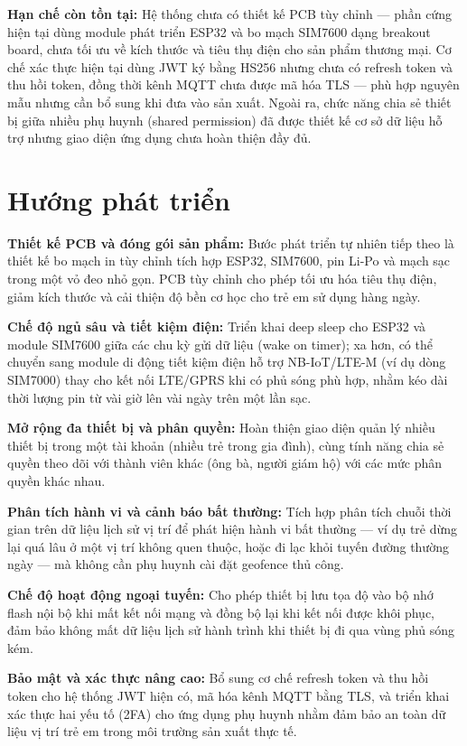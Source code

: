 \documentclass[../DoAn.tex]{subfiles}
\begin{document}
\textbf{Hạn chế còn tồn tại:} Hệ thống chưa có thiết kế PCB tùy chỉnh — phần cứng hiện tại dùng module phát triển ESP32 và bo mạch SIM7600 dạng breakout board, chưa tối ưu về kích thước và tiêu thụ điện cho sản phẩm thương mại. Cơ chế xác thực hiện tại dùng JWT ký bằng HS256 nhưng chưa có refresh token và thu hồi token, đồng thời kênh MQTT chưa được mã hóa TLS — phù hợp nguyên mẫu nhưng cần bổ sung khi đưa vào sản xuất. Ngoài ra, chức năng chia sẻ thiết bị giữa nhiều phụ huynh (shared permission) đã được thiết kế cơ sở dữ liệu hỗ trợ nhưng giao diện ứng dụng chưa hoàn thiện đầy đủ.

\section{Hướng phát triển}
\label{section:6.2}

\textbf{Thiết kế PCB và đóng gói sản phẩm:} Bước phát triển tự nhiên tiếp theo là thiết kế bo mạch in tùy chỉnh tích hợp ESP32, SIM7600, pin Li-Po và mạch sạc trong một vỏ đeo nhỏ gọn. PCB tùy chỉnh cho phép tối ưu hóa tiêu thụ điện, giảm kích thước và cải thiện độ bền cơ học cho trẻ em sử dụng hàng ngày.

\textbf{Chế độ ngủ sâu và tiết kiệm điện:} Triển khai deep sleep cho ESP32 và module SIM7600 giữa các chu kỳ gửi dữ liệu (wake on timer); xa hơn, có thể chuyển sang module di động tiết kiệm điện hỗ trợ NB-IoT/LTE-M (ví dụ dòng SIM7000) thay cho kết nối LTE/GPRS khi có phủ sóng phù hợp, nhằm kéo dài thời lượng pin từ vài giờ lên vài ngày trên một lần sạc.

\textbf{Mở rộng đa thiết bị và phân quyền:} Hoàn thiện giao diện quản lý nhiều thiết bị trong một tài khoản (nhiều trẻ trong gia đình), cùng tính năng chia sẻ quyền theo dõi với thành viên khác (ông bà, người giám hộ) với các mức phân quyền khác nhau.

\textbf{Phân tích hành vi và cảnh báo bất thường:} Tích hợp phân tích chuỗi thời gian trên dữ liệu lịch sử vị trí để phát hiện hành vi bất thường — ví dụ trẻ dừng lại quá lâu ở một vị trí không quen thuộc, hoặc đi lạc khỏi tuyến đường thường ngày — mà không cần phụ huynh cài đặt geofence thủ công.

\textbf{Chế độ hoạt động ngoại tuyến:} Cho phép thiết bị lưu tọa độ vào bộ nhớ flash nội bộ khi mất kết nối mạng và đồng bộ lại khi kết nối được khôi phục, đảm bảo không mất dữ liệu lịch sử hành trình khi thiết bị đi qua vùng phủ sóng kém.

\textbf{Bảo mật và xác thực nâng cao:} Bổ sung cơ chế refresh token và thu hồi token cho hệ thống JWT hiện có, mã hóa kênh MQTT bằng TLS, và triển khai xác thực hai yếu tố (2FA) cho ứng dụng phụ huynh nhằm đảm bảo an toàn dữ liệu vị trí trẻ em trong môi trường sản xuất thực tế.
\end{document}
